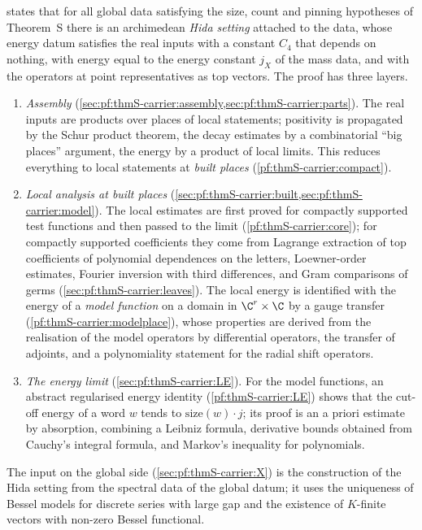  states that for all global data satisfying the size, count and pinning hypotheses of
Theorem~S there is an archimedean \emph{Hida setting} attached to the data, whose energy datum satisfies the real inputs
with a constant $C_4$ that depends on nothing, with energy equal to the energy constant $j_X$ of the mass data,
and with the operators at point representatives as top vectors. The proof has three layers.
\begin{enumerate}[label=(\alph*)]
\item \emph{Assembly} (\cref{sec:pf:thmS-carrier:assembly,sec:pf:thmS-carrier:parts}). The real inputs are products over
  places of local statements; positivity is propagated by the Schur product theorem, the decay estimates by a
  combinatorial ``big places'' argument, the energy by a product of local limits. This reduces everything to local
  statements at \emph{built places} (\cref{pf:thmS-carrier:compact}).
\item \emph{Local analysis at built places} (\cref{sec:pf:thmS-carrier:built,sec:pf:thmS-carrier:model}). The local
  estimates are first proved for compactly supported test functions and then passed to the limit
  (\cref{pf:thmS-carrier:core}); for compactly supported coefficients they come from Lagrange extraction of top coefficients
  of polynomial dependences on the letters, Loewner-order estimates, Fourier inversion with third differences, and Gram
  comparisons of germs (\cref{sec:pf:thmS-carrier:leaves}). The local energy is identified with the energy of a \emph{model
  function} on a domain in $\C^r\times\C$ by a gauge transfer (\cref{pf:thmS-carrier:modelplace}), whose properties are
  derived from the realisation of the model operators by differential operators, the transfer of adjoints, and a
  polynomiality statement for the radial shift operators.
\item \emph{The energy limit} (\cref{sec:pf:thmS-carrier:LE}). For the model functions, an abstract regularised energy
  identity (\cref{pf:thmS-carrier:LE}) shows that the cut-off energy of a word $w$ tends to $\mathrm{size}(w)\cdot j$; its
  proof is an a priori estimate by absorption, combining a Leibniz formula, derivative bounds obtained from Cauchy's
  integral formula, and Markov's inequality for polynomials.
\end{enumerate}
The input on the global side (\cref{sec:pf:thmS-carrier:X}) is the construction of the Hida setting from the spectral
data of the global datum; it uses the uniqueness of Bessel models for discrete series with large gap and the existence of
$K$-finite vectors with non-zero Bessel functional.

